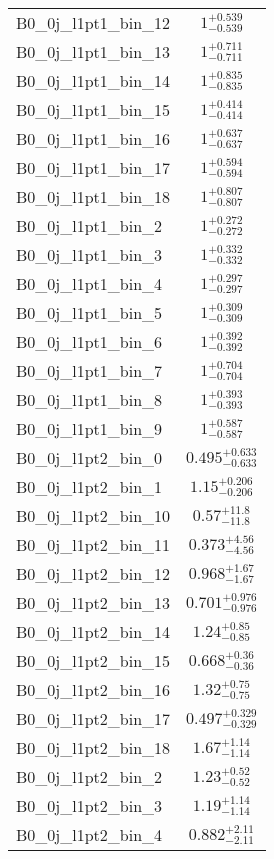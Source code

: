 \begin{tabular}{|l|c|}
B0\_0j\_l1pt1\_bin\_12 & $1^{+0.539}_{-0.539}$ \\
B0\_0j\_l1pt1\_bin\_13 & $1^{+0.711}_{-0.711}$ \\
B0\_0j\_l1pt1\_bin\_14 & $1^{+0.835}_{-0.835}$ \\
B0\_0j\_l1pt1\_bin\_15 & $1^{+0.414}_{-0.414}$ \\
B0\_0j\_l1pt1\_bin\_16 & $1^{+0.637}_{-0.637}$ \\
B0\_0j\_l1pt1\_bin\_17 & $1^{+0.594}_{-0.594}$ \\
B0\_0j\_l1pt1\_bin\_18 & $1^{+0.807}_{-0.807}$ \\
B0\_0j\_l1pt1\_bin\_2 & $1^{+0.272}_{-0.272}$ \\
B0\_0j\_l1pt1\_bin\_3 & $1^{+0.332}_{-0.332}$ \\
B0\_0j\_l1pt1\_bin\_4 & $1^{+0.297}_{-0.297}$ \\
B0\_0j\_l1pt1\_bin\_5 & $1^{+0.309}_{-0.309}$ \\
B0\_0j\_l1pt1\_bin\_6 & $1^{+0.392}_{-0.392}$ \\
B0\_0j\_l1pt1\_bin\_7 & $1^{+0.704}_{-0.704}$ \\
B0\_0j\_l1pt1\_bin\_8 & $1^{+0.393}_{-0.393}$ \\
B0\_0j\_l1pt1\_bin\_9 & $1^{+0.587}_{-0.587}$ \\
B0\_0j\_l1pt2\_bin\_0 & $0.495^{+0.633}_{-0.633}$ \\
B0\_0j\_l1pt2\_bin\_1 & $1.15^{+0.206}_{-0.206}$ \\
B0\_0j\_l1pt2\_bin\_10 & $0.57^{+11.8}_{-11.8}$ \\
B0\_0j\_l1pt2\_bin\_11 & $0.373^{+4.56}_{-4.56}$ \\
B0\_0j\_l1pt2\_bin\_12 & $0.968^{+1.67}_{-1.67}$ \\
B0\_0j\_l1pt2\_bin\_13 & $0.701^{+0.976}_{-0.976}$ \\
B0\_0j\_l1pt2\_bin\_14 & $1.24^{+0.85}_{-0.85}$ \\
B0\_0j\_l1pt2\_bin\_15 & $0.668^{+0.36}_{-0.36}$ \\
B0\_0j\_l1pt2\_bin\_16 & $1.32^{+0.75}_{-0.75}$ \\
B0\_0j\_l1pt2\_bin\_17 & $0.497^{+0.329}_{-0.329}$ \\
B0\_0j\_l1pt2\_bin\_18 & $1.67^{+1.14}_{-1.14}$ \\
B0\_0j\_l1pt2\_bin\_2 & $1.23^{+0.52}_{-0.52}$ \\
B0\_0j\_l1pt2\_bin\_3 & $1.19^{+1.14}_{-1.14}$ \\
B0\_0j\_l1pt2\_bin\_4 & $0.882^{+2.11}_{-2.11}$ \\

\end{tabular}
